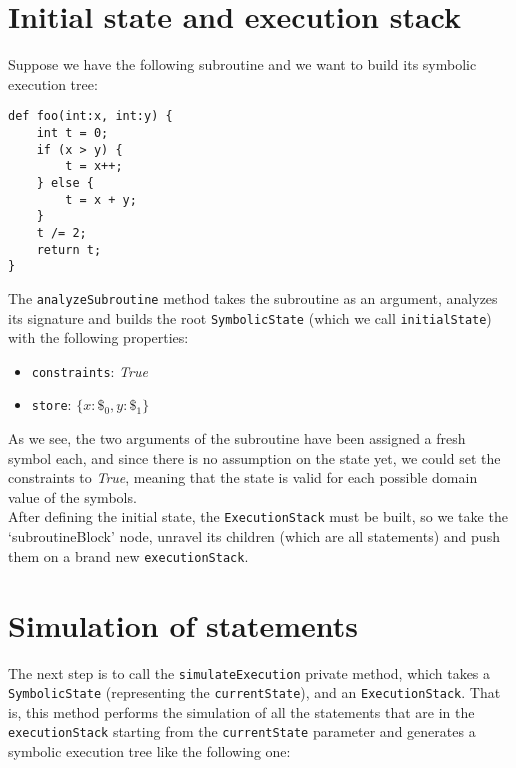 \documentclass[12pt,a4paper]{report}
\theoremstyle{definition}
\theoremstyle{definition}
\theoremstyle{definition}
\begin{document}
\section{Initial state and execution stack}
Suppose we have the following subroutine and we want to build its symbolic execution tree:
\begin{lstlisting}
def foo(int:x, int:y) {
    int t = 0;
    if (x > y) {
        t = x++;
    } else {
        t = x + y;
    }
    t /= 2;
    return t;
}
\end{lstlisting}
The \texttt{analyzeSubroutine} method takes the subroutine as an argument, analyzes its signature and builds the root \texttt{SymbolicState} (which we call \texttt{initialState}) with the following properties:
\begin{itemize}
    \itemsep 0em
    \item \texttt{constraints}: \textit{True}
    \item \texttt{store}: $\{x: \$_0, y: \$_1\}$
\end{itemize}
As we see, the two arguments of the subroutine have been assigned a fresh symbol each, and since there is no assumption on the state yet, we could set the constraints to \textit{True}, meaning that the state is valid for each possible domain value of the symbols.\\
After defining the initial state, the \texttt{ExecutionStack} must be built, so we take the `subroutineBlock' node, unravel its children (which are all statements) and push them on a brand new \texttt{executionStack}.\\

\section{Simulation of statements}
The next step is to call the \texttt{simulateExecution} private method, which takes a \texttt{SymbolicState} (representing the \texttt{currentState}), and an \texttt{ExecutionStack}. That is, this method performs the simulation of all the statements that are in the \texttt{executionStack} starting from the \texttt{currentState} parameter and generates a symbolic execution tree like the following one:\\
\end{document}
